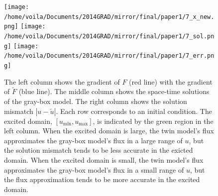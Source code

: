 \documentclass[a4paper,onecolumn]{article}
\theoremstyle{remark}
\begin{document}
\begin{figure}[H]\begin{center}
    \texttt{[image: /home/voila/Documents/2014GRAD/mirror/final/paper1/7\_x\_new.png]}
    \texttt{[image: /home/voila/Documents/2014GRAD/mirror/final/paper1/7\_sol.png]}
    \texttt{[image: /home/voila/Documents/2014GRAD/mirror/final/paper1/7\_err.png]}
    \label{fig: sol compare}
    \caption{The left column shows the gradient of $F$ (red line) with the gradient of $\tilde{F}$ (blue line). 
             The middle column shows the space-time solutions of the gray-box model.
             The right column shows the solution mismatch $\left|u-\tilde{u}\right|$. Each row corresponds to an initial condition.
             The excited domain, $[u_{\min}, u_{\max}]$, is indicated by the green region in
             the left column.
             When the excited domain is large, the twin model's flux 
             approximates the gray-box model's flux in a large range of $u$, but
             the solution mismatch tends to be less accurate in the exicted domain. When the excited domain is small,
             the twin model's flux approximates the gray-box model's flux in a small range of $u$, but the flux
             approximation tends to be more accurate in the excited domain.}
\end{center}

\end{figure}
\end{document}

